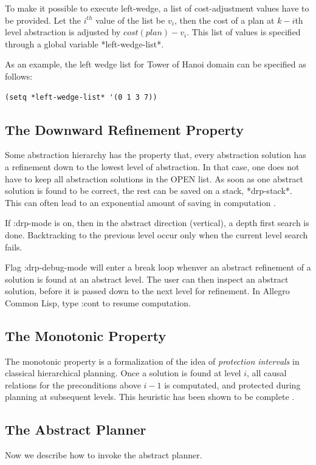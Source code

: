 To make it possible to execute left-wedge, a list of cost-adjustment
values have to be provided.  Let the $i^{th}$ value of the list be $v_i$,
then the cost of a plan at $k-i$th level abstraction is adjusted by $cost(plan)-v_i$.
This list of values is specified through a global variable *left-wedge-list*.

As an example, the left wedge list for Tower of Hanoi domain can be
specified as follows:
\begin{verbatim}
(setq *left-wedge-list* '(0 1 3 7))
\end{verbatim}

\subsection{The Downward Refinement Property}
Some abstraction hierarchy has the property that, every abstraction
solution has a refinement down to the lowest level of abstraction.  In
that case, one does not have to keep all abstraction solutions in the
OPEN list.  As soon as one abstract solution is found to be correct,
the rest can be saved on a stack, *drp-stack*.  This can often lead to
an exponential amount of saving in computation \cite{downward}.

If :drp-mode is on, then in the abstract direction (vertical), a depth
first search is done.  Backtracking to the previous level occur only
when the current level search fails. 

Flag :drp-debug-mode will enter a break loop whenver an abstract
refinement of a solution is found at an abstract level.  The user can
then inspect an abstract solution, before it is passed down to the
next level for refinement.  In Allegro Common Lisp, type :cont to
resume computation.

\subsection{The Monotonic Property}
The monotonic property is a formalization of the idea of {\em
protection intervals} in classical hierarchical planning.  Once a
solution is found at level $i$, all causal relations for the
preconditions above $i-1$ is computated, and protected during planning
at subsequent levels.  This heuristic has been shown to be complete
\cite{abtweak}.

\subsection{The Abstract Planner}
Now we describe how to invoke the abstract planner.


